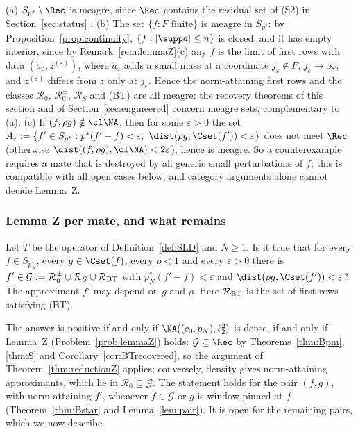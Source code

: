 \begin{remark}\label{rem:meagre}
(a) $S_{p^*}\setminus\Rec$ is meagre, since $\Rec$ contains the residual
set of (S2) in Section~\ref{sec:status} \cite{PrA}.  (b) The set
$\{f:F\text{ finite}\}$ is meagre in $S_{p^*}$: by
Proposition~\ref{prop:continuity}, $\{f:|\supp a|\le n\}$ is closed, and it
has empty interior, since by Remark~\ref{rem:lemmaZ}(c) any $f$ is the
limit of first rows with data $(a_\varepsilon,z^{(\varepsilon)})$, where
$a_\varepsilon$ adds a small mass at a coordinate $j_\varepsilon\notin F$,
$j_\varepsilon\to\infty$, and $z^{(\varepsilon)}$ differs from $z$ only at
$j_\varepsilon$.  Hence the norm-attaining first rows and the classes
$\mathcal R_0$, $\mathcal R_0^\pm$, $\mathcal R_S$ and \textup{(BT)} are
all meagre: the recovery theorems of this section and of
Section~\ref{sec:engineered} concern meagre sets, complementary to (a).
(c) If $(f,\rho g)\notin\cl\NA$, then for some $\varepsilon>0$ the set
$A_\varepsilon:=\{f'\in S_{p^*}:p^*(f'-f)<\varepsilon,\ \dist(\rho g,
\Cset(f'))<\varepsilon\}$ does not meet $\Rec$ (otherwise
$\dist((f,\rho g),\cl\NA)<2\varepsilon$), hence is meagre.  So a
counterexample requires a mate that is destroyed by all generic small
perturbations of $f$; this is compatible with all open cases below, and
category arguments alone cannot decide Lemma~Z.
\end{remark}

\subsubsection*{Lemma Z per mate, and what remains}

\begin{problem}\label{prob:lemmaZper}
Let $T$ be the operator of Definition~\ref{def:SLD} and $N\ge1$.  Is it
true that for every $f\in S_{p_N^*}$, every $g\in\Cset(f)$, every $\rho<1$
and every $\varepsilon>0$ there is $f'\in\mathcal G:=\mathcal R_0^\pm\cup
\mathcal R_S\cup\mathcal R_{\rm BT}$ with $p_N^*(f'-f)<\varepsilon$ and
$\dist(\rho g,\Cset(f'))<\varepsilon$?  The approximant $f'$ may depend on
$g$ and $\rho$.  Here $\mathcal R_{\rm BT}$ is the set of first rows
satisfying \textup{(BT)}.
\end{problem}

The answer is positive if and only if $\NA((c_0,p_N),\ell_2^2)$ is dense,
if and only if Lemma~Z (Problem~\ref{prob:lemmaZ}) holds: $\mathcal
G\subseteq\Rec$ by Theorems~\ref{thm:Bpm}, \ref{thm:S} and
Corollary~\ref{cor:BTrecovered}, so the argument of
Theorem~\ref{thm:reductionZ} applies; conversely, density gives
norm-attaining approximants, which lie in $\mathcal R_0\subseteq\mathcal
G$.  The statement holds for the pair $(f,g)$, with norm-attaining $f'$,
whenever $f\in\mathcal G$ or $g$ is window-pinned at $f$
(Theorem~\ref{thm:Bstar} and Lemma~\ref{lem:pair}).  It is open for the
remaining pairs, which we now describe.


